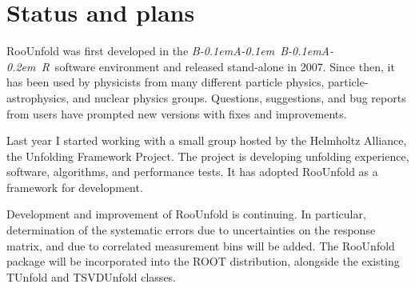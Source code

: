 \documentclass{cernrep}
\newcommand{\babar}{\mbox{\slshape B\kern-0.1em{\small A}\kern-0.1em B\kern-0.1em{\small A\kern-0.2em R}}}
\begin{document}
\section{Status and plans}

RooUnfold was first developed in the \babar\ software environment and
released stand-alone in 2007.
Since then, it has been used by physicists from many
different particle physics, particle-astrophysics, and nuclear physics groups.
Questions, suggestions, and bug reports from users
have prompted new versions with fixes and improvements.

Last year I started working with a small group hosted by the
Helmholtz Alliance, the Unfolding Framework Project\cite{unfolding-project}.
The project is developing unfolding experience, software, algorithms, and performance tests.
It has adopted RooUnfold as a framework for development.

Development and improvement of RooUnfold is continuing.
In particular, determination of the systematic errors due to uncertainties on
the response matrix, and due to correlated measurement bins will be added.
The RooUnfold package will be incorporated into the ROOT distribution,
alongside the existing TUnfold and TSVDUnfold classes.

\end{document}
